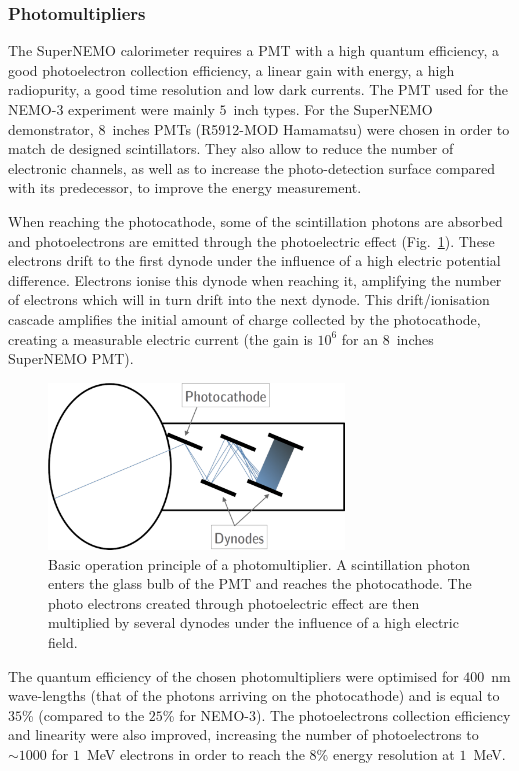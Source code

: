 \subsubsection*{Photomultipliers}

The SuperNEMO calorimeter requires a PMT with a high quantum efficiency, a good photoelectron collection efficiency, a linear gain with energy, a high radiopurity, a good time resolution and low dark currents.
The PMT used for the NEMO-$3$ experiment were mainly $5$~inch types.
For the SuperNEMO demonstrator, $8$~inches PMTs (R5912-MOD Hamamatsu) were chosen in order to match de designed scintillators.
They also allow to reduce the number of electronic channels, as well as to increase the photo-detection surface compared with its predecessor, to improve the energy measurement.

When reaching the photocathode, some of the scintillation photons are absorbed and photoelectrons are emitted through the photoelectric effect (Fig.~\ref{fig:PMT_design}).
These electrons drift to the first dynode under the influence of a high electric potential difference.
Electrons ionise this dynode when reaching it, amplifying the number of electrons which will in turn drift into the next dynode.
This drift/ionisation cascade amplifies the initial amount of charge collected by the photocathode, creating a measurable electric current (the gain is $10^{6}$ for an $8$~inches SuperNEMO PMT).
\begin{figure}[h!]
\centering
\includegraphics[width=0.7\textwidth]{SNdemonstrator/fig_SNdemonstrator/PMT_plan.pdf}
\caption{Basic operation principle of a photomultiplier.
  A scintillation photon enters the glass bulb of the PMT and reaches the photocathode.
  The photo electrons created through photoelectric effect are then multiplied by several dynodes under the influence of a high electric field.
\label{fig:PMT_design}}
\end{figure}

The quantum efficiency of the chosen photomultipliers were optimised for $400$~nm wave-lengths (that of the photons arriving on the photocathode) and is equal to $35$\% (compared to the $25$\% for NEMO-$3$).
The photoelectrons collection efficiency and linearity were also improved, increasing the number of photoelectrons to $\sim1000$ for $1$~MeV electrons in order to reach the $8$\% energy resolution at $1$~MeV.


